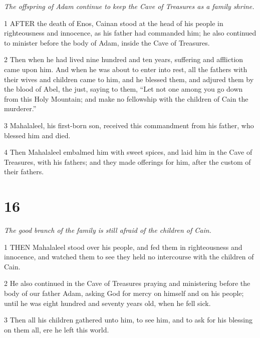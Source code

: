 \par \textit{The offspring of Adam continue to keep the Cave of Treasures as a family shrine.}

\par 1 AFTER the death of Enos, Cainan stood at the head of his people in righteousness and innocence, as his father had commanded him; he also continued to minister before the body of Adam, inside the Cave of Treasures.

\par 2 Then when he had lived nine hundred and ten years, suffering and affliction came upon him. And when he was about to enter into rest, all the fathers with their wives and children came to him, and he blessed them, and adjured them by the blood of Abel, the just, saying to them, “Let not one among you go down from this Holy Mountain; and make no fellowship with the children of Cain the murderer.”

\par 3 Mahalaleel, his first-born son, received this commandment from his father, who blessed him and died.

\par 4 Then Mahalaleel embalmed him with sweet spices, and laid him in the Cave of Treasures, with his fathers; and they made offerings for him, after the custom of their fathers.



\chapter{16}

\par \textit{The good branch of the family is still afraid of the children of Cain.}

\par 1 THEN Mahalaleel stood over his people, and fed them in righteousness and innocence, and watched them to see they held no intercourse with the children of Cain.

\par 2 He also continued in the Cave of Treasures praying and ministering before the body of our father Adam, asking God for mercy on himself and on his people; until he was eight hundred and seventy years old, when he fell sick.

\par 3 Then all his children gathered unto him, to see him, and to ask for his blessing on them all, ere he left this world.

